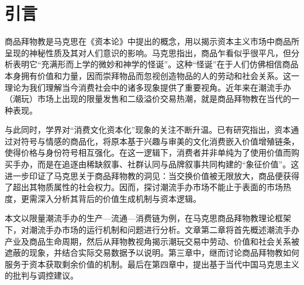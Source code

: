 
\chapter{引言}
商品拜物教是马克思在《资本论》中提出的概念，用以揭示资本主义市场中商品所呈现的神秘性质及其对人们意识的影响\cite{dekaer.makesi2012zibenlun}。马克思指出，商品乍看似乎很平凡，但分析表明它“充满形而上学的微妙和神学的怪诞”。这种“怪诞”在于人们仿佛相信商品本身拥有价值和力量，因而崇拜物品而忽视创造物品的人的劳动和社会关系\cite{song2024guan}。这一理论为我们理解当今消费社会中的诸多现象提供了重要视角。近年来在潮流手办（潮玩）市场上出现的限量发售和二级溢价交易热潮，就是商品拜物教在当代的一种表现\cite{WJXB202502001,XJZS202406003,MYSD202406008}。

与此同时，学界对“消费文化资本化”现象的关注不断升温。已有研究指出，资本通过对符号与情感的商品化，将原本基于兴趣与审美的文化消费嵌入价值增殖链条，使得价格与身份符号相互强化。在这一逻辑下，消费者并非单纯为了使用价值而购买手办，而是在追逐由稀缺叙事、社群认同与品牌叙事共同构建的“象征价值”。这进一步印证了马克思关于商品拜物教的洞见：当交换价值被无限放大，商品便获得了超出其物质属性的社会权力。因而，探讨潮流手办市场不能止于表面的市场热度，更需深入分析其背后的价值生成机制与资本逻辑。

本文以限量潮流手办的生产—流通—消费链为例，在马克思商品拜物教理论框架下，对潮流手办市场的运行机制和问题进行分析。文章第二章将首先概述潮流手办产业及商品生命周期，然后从拜物教视角揭示潮玩交易中劳动、价值和社会关系被遮蔽的现象，并结合实际交易数据予以说明。第三章中，继而讨论商品拜物教如何服务于资本获取剩余价值的机制。最后在第四章中，提出基于当代中国马克思主义的批判与调控建议。